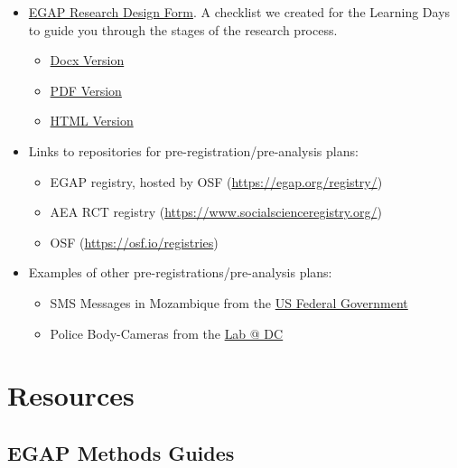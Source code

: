 \documentclass[12pt,]{book}
\begin{document}
\begin{itemize}
\item
  \href{https://egap.github.io/learningdays-resources/Exercises/design-form.html}{EGAP Research Design Form}. A checklist we created for the Learning Days to guide you through the stages of the research process.

  \begin{itemize}
  \item
    \href{https://egap.github.io/learningdays-resources/Exercises/design-form.docx}{Docx Version}
  \item
    \href{https://egap.github.io/learningdays-resources/Exercises/design-form.pdf}{PDF Version}
  \item
    \href{https://egap.github.io/learningdays-resources/Exercises/design-form.html}{HTML Version}
  \end{itemize}
\item
  Links to repositories for pre-registration/pre-analysis plans:

  \begin{itemize}
  \item
    EGAP registry, hosted by OSF (\url{https://egap.org/registry/})
  \item
    AEA RCT registry (\url{https://www.socialscienceregistry.org/})
  \item
    OSF (\url{https://osf.io/registries})
  \end{itemize}
\item
  Examples of other pre-registrations/pre-analysis plans:

  \begin{itemize}
  \item
    SMS Messages in Mozambique from the \href{https://oes.gsa.gov/projects/sms-mozambique/}{US Federal Government}
  \item
    Police Body-Cameras from the \href{https://osf.io/472zh}{Lab @ DC}
  \end{itemize}
\end{itemize}

\hypertarget{resources}{%
\section{Resources}\label{resources}}

\hypertarget{egap-methods-guides}{%
\subsection{EGAP Methods Guides}\label{egap-methods-guides}}
\end{document}
